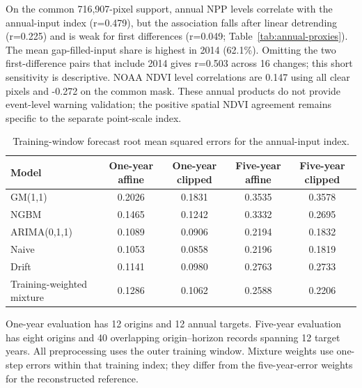 \documentclass[preprint,11pt,authoryear]{elsarticle}
\begin{document}
On the common 716,907-pixel support, annual NPP levels correlate with the annual-input index (r=0.479), but the association falls after linear detrending (r=0.225) and is weak for first differences (r=0.049; Table~\ref{tab:annual-proxies}). The mean gap-filled-input share is highest in 2014 (62.1\%). Omitting the two first-difference pairs that include 2014 gives r=0.503 across 16 changes; this short sensitivity is descriptive. NOAA NDVI level correlations are 0.147 using all clear pixels and -0.272 on the common mask. These annual products do not provide event-level warning validation; the positive spatial NDVI agreement remains specific to the separate point-scale index.

\begin{table}[htbp]
\centering
\caption{Training-window forecast root mean squared errors for the annual-input index.}
\label{tab:annual-forecast}
\footnotesize
\begin{tabular}{lcccc}
\toprule
Model & One-year affine & One-year clipped & Five-year affine & Five-year clipped \\
\midrule
GM(1,1) & 0.2026 & 0.1831 & 0.3535 & 0.3578 \\
NGBM & 0.1465 & 0.1242 & 0.3332 & 0.2695 \\
ARIMA(0,1,1) & 0.1089 & 0.0906 & 0.2194 & 0.1832 \\
Naive & 0.1053 & 0.0858 & 0.2196 & 0.1819 \\
Drift & 0.1141 & 0.0980 & 0.2763 & 0.2733 \\
Training-weighted mixture & 0.1286 & 0.1062 & 0.2588 & 0.2206 \\
\bottomrule
\end{tabular}

\vspace{2pt}
{\scriptsize One-year evaluation has 12 origins and 12 annual targets. Five-year evaluation has eight origins and 40 overlapping origin--horizon records spanning 12 target years. All preprocessing uses the outer training window. Mixture weights use one-step errors within that training index; they differ from the five-year-error weights for the reconstructed reference.}
\end{table}
\end{document}
